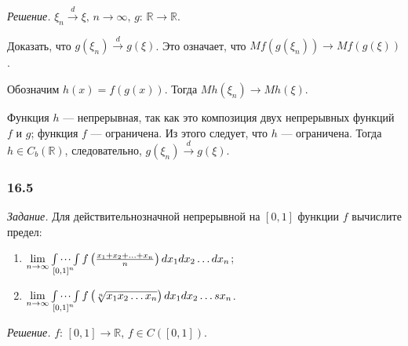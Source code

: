 \textit{Решение.}
$ \xi_n \overset{d}{ \rightarrow } \xi, \,
n \rightarrow \infty, \,
g: \, \mathbb{R} \rightarrow \mathbb{R}$.

Доказать, что $g \left( \xi_n \right) \overset{d}{ \rightarrow } g \left( \xi \right) $.
Это означает, что
$Mf \left( g \left( \xi_n \right) \right) \rightarrow Mf \left( g \left( \xi \right) \right) $.

Обозначим $h \left( x \right) = f \left( g \left( x \right) \right) $.
Тогда $Mh \left( \xi_n \right) \rightarrow Mh \left( \xi \right) $.

Функция $h$ --- непрерывная, так как это композиция двух непрерывных функций $f$ и $g$;
функция $f$ --- ограничена.
Из этого следует, что $h$ --- ограничена.
Тогда $h \in C_b \left( \mathbb{R} \right) $, следовательно,
$g \left( \xi_n \right) \overset{d}{ \rightarrow } g \left( \xi \right) $.

\subsubsection*{16.5}

\textit{Задание.}
Для действительнозначной непрерывной на $ \left[ 0, 1 \right] $ функции $f$ вычислите предел:
\begin{enumerate}[label=\alph*)]
\item $ \lim \limits_{n \to \infty } \idotsint \limits_{ \left[ 0, 1 \right]^n}
  f \left( \frac{x_1 + x_2 + \dotsc + x_n}{n} \right) dx_1 dx_2 \dotsc dx_n$;
\item $ \lim \limits_{n \to \infty } \idotsint \limits_{ \left[ 0, 1 \right]^n}
  f \left( \sqrt[n]{x_1 x_2 \dotsc x_n} \right) dx_1 dx_2 \dotsc sx_n$.
\end{enumerate}

\textit{Решение.}
$f: \, \left[ 0, 1 \right] \rightarrow \mathbb{R}, \,
  f \in C \left( \left[ 0, 1 \right] \right) $.


